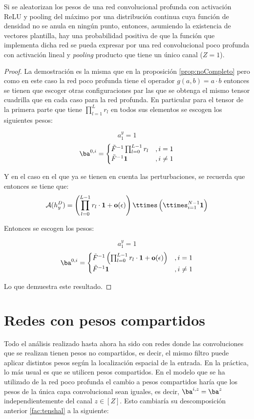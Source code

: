 \begin{prop}
Si se aleatorizan los pesos de una red convolucional profunda con activación ReLU y pooling del máximo por una distribución continua cuya función de densidad no se anula en ningún punto, entonces, asumiendo la existencia de vectores plantilla, hay una probabilidad positiva de que la función que implementa dicha red se pueda expresar por una red convolucional poco profunda con activación lineal y \textit{pooling} producto que tiene un único canal ($Z = 1$).
\end{prop}
\begin{proof}
La demostración es la misma que en la proposición \ref{prop:noCompleto} pero como en este caso la red poco profunda tiene el operador $g(a,b) = a\cdot b$ entonces se tienen que escoger otras configuraciones par las que se obtenga el mismo tensor cuadrilla que en cada caso para la red profunda. En particular para el tensor de la primera parte que tiene $\prod_{l=1}^{L} r_l$ en todos sus elementos se escogen los siguientes pesos:

$$
a_1^y=1
$$
$$
\ba^{0,i} = \begin{cases}
\tilde{F}^{-1}\prod_{l=0}^{L-1}r_l &, i=1\\
\tilde{F}^{-1}\mathbf{1} &, i\neq 1
\end{cases}
$$

Y en el caso en el que ya se tienen en cuenta las perturbaciones, se recuerda que entonces se tiene que:
$$
\mathcal{A}(h_y^D) =  \left( \prod_{l=0}^{L-1}r_l \cdot \mathbf{1} + \textbf{o}(\epsilon) \right) \ttimes \left( \ttimes^{N-1}_{i=1}\mathbf{1} \right)
$$

Entonces se escogen los pesos:

$$
a_1^y=1
$$
$$
\ba^{0,i} = \begin{cases}
\tilde{F}^{-1}\left(\prod_{l=0}^{L-1}r_l \cdot \mathbf{1} + \textbf{o}(\epsilon)\right) &, i=1\\
\tilde{F}^{-1}\mathbf{1} &, i\neq 1
\end{cases}
$$

Lo que demuestra este resultado.
\end{proof}

\section{Redes con pesos compartidos}
Todo el análisis realizado hasta ahora ha sido con redes donde las convoluciones que se realizan tienen pesos no compartidos, es decir, el mismo filtro puede aplicar distintos pesos según la localización espacial de la entrada. En la práctica, lo más usual es que se utilicen pesos compartidos. En el modelo que se ha utilizado de la red poco profunda el cambio a pesos compartidos haría que los pesos de la única capa convolucional sean iguales, es decir, $\ba^{i,z} = \ba^{z}$ independientemente del canal $z\in [Z]$. Esto cambiaría su descomposición anterior \eqref{fac:tenshal} a la siguiente:

